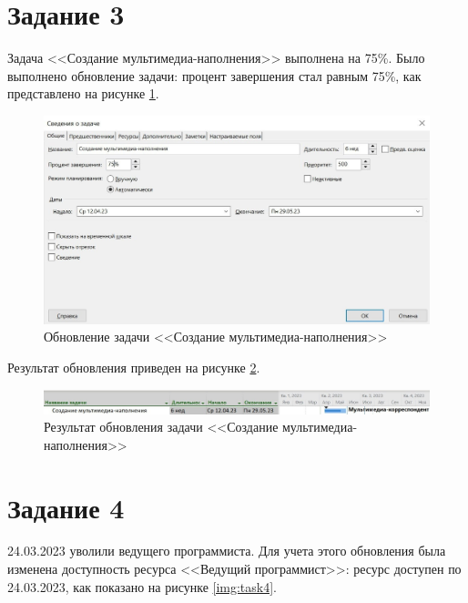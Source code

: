 \section*{Задание 3}

Задача <<Создание мультимедиа-наполнения>> выполнена на 75\%. Было выполнено обновление задачи: процент завершения стал равным 75\%, как представлено на рисунке \ref{img:task3}.

\begin{figure}[H]
	\begin{center}
		\includegraphics[scale=0.3]{inc/img/task3.jpg}
	\end{center}
	\captionsetup{justification=centering}
	\caption{Обновление задачи <<Создание мультимедиа-наполнения>>}
	\label{img:task3}
\end{figure}

Результат обновления приведен на рисунке \ref{img:task3-result}.

\begin{figure}[H]
	\begin{center}
		\includegraphics[scale=0.3]{inc/img/task3-result.jpg}
	\end{center}
	\captionsetup{justification=centering}
	\caption{Результат обновления задачи <<Создание мультимедиа-наполнения>>}
	\label{img:task3-result}
\end{figure}

\section*{Задание 4}

24.03.2023 уволили ведущего программиста. Для учета этого обновления была изменена доступность ресурса <<Ведущий программист>>: ресурс доступен по 24.03.2023, как показано на рисунке \ref{img:task4}.

